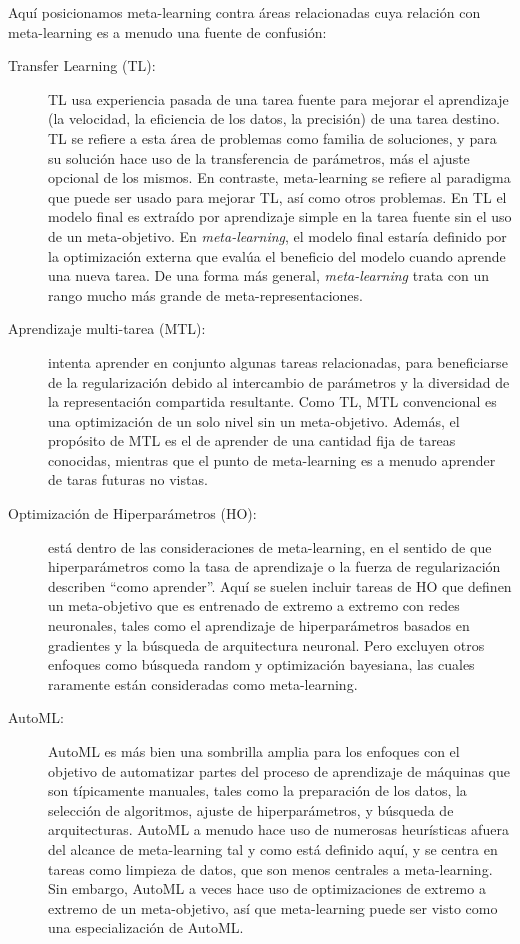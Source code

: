 Aquí posicionamos meta-learning contra áreas relacionadas cuya relación con meta-learning es a menudo una fuente de confusión:

\begin{description}
	\item[Transfer Learning (TL):] TL usa experiencia pasada de una tarea fuente para mejorar el aprendizaje (la velocidad, la eficiencia de los datos, la precisión) de una tarea destino. TL se refiere a esta área de problemas como familia de soluciones, y para su solución hace uso de la transferencia de parámetros, más el ajuste opcional de los mismos. En contraste, meta-learning se refiere al paradigma que puede ser usado para mejorar TL, así como otros problemas. En TL el modelo final es extraído por aprendizaje simple en la tarea fuente sin el uso de un meta-objetivo. En \emph{meta-learning}, el modelo final estaría definido por la optimización externa que evalúa el beneficio del modelo cuando aprende una nueva tarea. De una forma más general, \emph{meta-learning} trata con un rango mucho más grande de meta-representaciones.
	\item[Aprendizaje multi-tarea (MTL):] intenta aprender en conjunto algunas tareas relacionadas, para beneficiarse de la regularización debido al intercambio de parámetros y la diversidad de la representación compartida resultante. Como TL, MTL convencional es una optimización de un solo nivel sin un meta-objetivo. Además, el propósito de MTL es el de aprender de una cantidad fija de tareas conocidas, mientras que el punto de meta-learning es a menudo aprender de taras futuras no vistas. 
	\item[Optimización de Hiperparámetros (HO):] está dentro de las consideraciones de meta-learning, en el sentido de que hiperparámetros como la tasa de aprendizaje o la fuerza de regularización describen “como aprender”. Aquí se suelen incluir tareas de HO que definen un meta-objetivo que es entrenado de extremo a extremo con redes neuronales, tales como el aprendizaje de hiperparámetros basados en gradientes y la búsqueda de arquitectura neuronal. Pero excluyen otros enfoques como búsqueda random y optimización bayesiana, las cuales raramente están consideradas como meta-learning.
	\item[AutoML:] AutoML es más bien una sombrilla amplia para los enfoques con el objetivo de automatizar partes del proceso de aprendizaje de máquinas que son típicamente manuales, tales como la preparación de los datos, la selección de algoritmos, ajuste de hiperparámetros, y búsqueda de arquitecturas. AutoML a menudo hace uso de numerosas heurísticas afuera del alcance de meta-learning tal y como está definido aquí, y se centra en tareas como limpieza de datos, que son menos centrales a meta-learning. Sin embargo, AutoML a veces hace uso de optimizaciones de extremo a extremo de un meta-objetivo, así que meta-learning puede ser visto como una especialización de AutoML.
\end{description}

